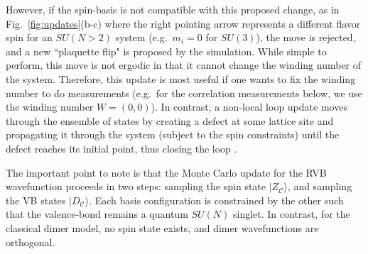 \documentclass[11pt]{iopart}
\begin{document}
%
However, if the spin-basis is not compatible with this proposed change, as in Fig.~\ref{fig:updates}(b-c) where the right pointing arrow represents a different flavor spin for an $SU(N>2)$ system (e.g.\ $m_i=0$ for $SU(3)$), the move is rejected, and a new ``plaquette flip" is proposed by the simulation.
%
While simple to perform, this move is not ergodic in that it cannot change the winding number of the system.
%
Therefore, this update is most useful if one wants to fix the winding number to do measurements (e.g.\ for the correlation measurements below, we use the winding number $W=(0,0)$).
%
In contrast, a non-local loop update moves through the ensemble of states by creating a defect at some lattice site and propagating it through the system (subject to the spin constraints) until the defect reaches its initial point, thus closing the loop \cite{sandvik2010loop}.
%

The important point to note is that the Monte Carlo update for the RVB wavefunction proceeds in two steps: sampling the spin state $|Z_{\mathcal C} \rangle$, and sampling the VB states $|D_{\mathcal C} \rangle$.  Each basis configuration is constrained by the other such that the valence-bond remains a quantum $SU(N)$ singlet.  In contrast, for the classical dimer model, no spin state exists, and dimer wavefunctions are orthogonal.
\end{document}
